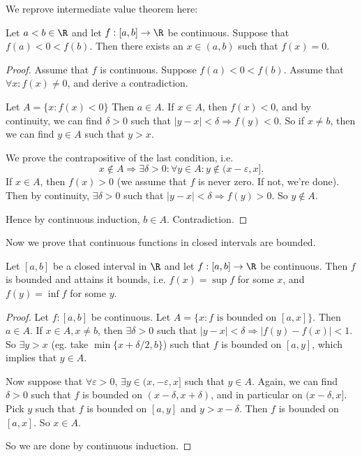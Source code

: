 \documentclass[a4paper]{article}
\begin{document}
We reprove intermediate value theorem here:

\begin{thm}
  Let $a < b\in \R$ and let $f: [a, b] \to \R$ be continuous. Suppose that $f(a) < 0 < f(b)$. Then there exists an $x\in (a, b)$ such that $f(x) = 0$.
\end{thm}

\begin{proof}
  Assume that $f$ is continuous. Suppose $f(a) < 0 < f(b)$. Assume that $\forall x: f(x) \not =0$, and derive a contradiction.

  Let $A = \{x: f(x) < 0\}$ Then $a\in A$. If $x\in A$, then $f(x) < 0$, and by continuity, we can find $\delta > 0$ such that $|y - x| < \delta\Rightarrow  f(y) < 0$. So if $x\not= b$, then we can find $y\in A$ such that $y > x$.

  We prove the contrapositive of the last condition, i.e.
  \[
    x\not\in A\Rightarrow \exists \delta > 0: \forall y\in A: y\not\in(x - \varepsilon, x].
  \]
  If $x\in A$, then $f(x) > 0$ (we assume that $f$ is never zero. If not, we're done). Then by continuity, $\exists \delta > 0$ such that $|y - x| < \delta \Rightarrow  f(y) > 0$. So $y\not\in A$.

  Hence by continuous induction, $b\in A$. Contradiction.
\end{proof}

Now we prove that continuous functions in closed intervals are bounded.
\begin{thm}
  Let $[a, b]$ be a closed interval in $\R$ and let $f: [a, b] \to \R$ be continuous. Then $f$ is bounded and attains it bounds, i.e. $f(x) = \sup f$ for some $x$, and $f(y) = \inf f$ for some $y$.
\end{thm}

\begin{proof}
  Let $f: [a, b]$ be continuous. Let $A = \{x: f\text{ is bounded on }[a, x]\}$. Then $a\in A$. If $x\in A, x\not= b$, then $\exists \delta > 0$ such that $|y - x| < \delta \Rightarrow  |f(y) - f(x)| < 1$. So $\exists y > x$ (eg. take $\min\{x + \delta/2, b\}$) such that $f$ is bounded on $[a, y]$, which implies that $y\in A$.

  Now suppose that $\forall \varepsilon > 0$, $\exists y\in (x, - \varepsilon, x]$ such that $y\in A$. Again, we can find $\delta > 0$ such that $f$ is bounded on $(x - \delta, x + \delta)$, and in particular on $(x - \delta, x]$. Pick $y$ such that $f$ is bounded on $[a, y]$ and $y > x - \delta$. Then $f$ is bounded on $[a, x]$. So $x\in A$.

  So we are done by continuous induction.
\end{proof}
\end{document}
